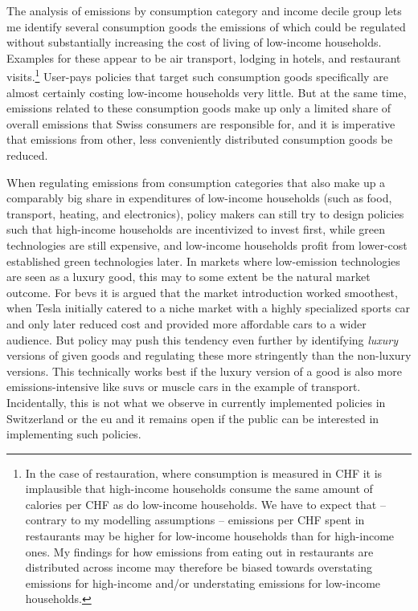 \documentclass[referee, lineno, pdflatex,sn-apa]{sn-jnl}%
\theoremstyle{thmstyleone}%
\theoremstyle{thmstyletwo}%
\theoremstyle{thmstylethree}%
\begin{document}
The analysis of emissions by consumption category and income decile group lets me identify several consumption goods the emissions of which could be regulated without substantially increasing the cost of living of low-income households.
Examples for these appear to be air transport, lodging in hotels, and restaurant visits.\footnote{%
  In the case of restauration, where consumption is measured in CHF it is implausible that high-income households consume the same amount of calories per CHF as do low-income households.
  We have to expect that -- contrary to my modelling assumptions -- emissions per CHF spent in restaurants may be higher for low-income households than for high-income ones.
  My findings for how emissions from eating out in restaurants are distributed across income may therefore be biased towards overstating emissions for high-income and/or understating emissions for low-income households.
}
User-pays policies that target such consumption goods specifically are almost certainly costing low-income households very little.
But at the same time, emissions related to these consumption goods make up only a limited share of overall emissions that Swiss consumers are responsible for, and it is imperative that emissions from other, less conveniently distributed consumption goods be reduced.

When regulating emissions from consumption categories that also make up a comparably big share in expenditures of low-income households (such as food, transport, heating, and electronics), policy makers can still try to design policies such that high-income households are incentivized to invest first, while green technologies are still expensive, and low-income households profit from lower-cost established green technologies later.
In markets where low-emission technologies are seen as a luxury good, this may to some extent be the natural market outcome.
For \acp{bev} it is argued that the market introduction worked smoothest, when Tesla initially catered to a niche market with a highly specialized sports car and only later reduced cost and provided more affordable cars to a wider audience.
But policy may push this tendency even further by identifying \emph{luxury} versions of given goods and regulating these more stringently than the non-luxury versions.
This technically works best if the luxury version of a good is also more emissions-intensive like \acp{suv} or muscle cars in the example of transport.
Incidentally, this is not what we observe in currently implemented policies in Switzerland or the \ac{eu} and it remains open if the public can be interested in implementing such policies.
\end{document}
